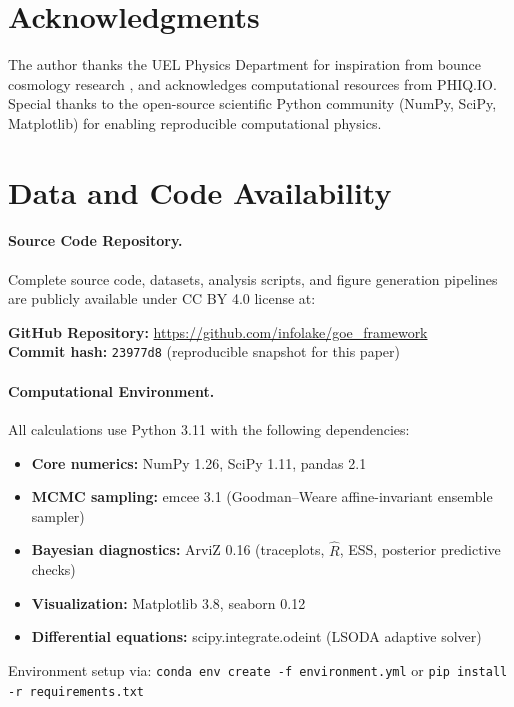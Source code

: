 \documentclass[12pt]{article}
\theoremstyle{definition}
\theoremstyle{plain}
\begin{document}
\section*{Acknowledgments}

The author thanks the UEL Physics Department for inspiration from bounce cosmology research \cite{barroso2024,demetrio2025}, and acknowledges computational resources from PHIQ.IO. Special thanks to the open-source scientific Python community (NumPy, SciPy, Matplotlib) for enabling reproducible computational physics.

\section*{Data and Code Availability}

\paragraph{Source Code Repository.}
Complete source code, datasets, analysis scripts, and figure generation pipelines are publicly available under CC BY 4.0 license at:

\begin{center}
\textbf{GitHub Repository:} \url{https://github.com/infolake/goe_framework} \\
\textbf{Commit hash:} \texttt{23977d8} (reproducible snapshot for this paper)
\end{center}

\paragraph{Computational Environment.}
All calculations use Python 3.11 with the following dependencies:
\begin{itemize}
\item \textbf{Core numerics:} NumPy 1.26, SciPy 1.11, pandas 2.1
\item \textbf{MCMC sampling:} emcee 3.1 (Goodman--Weare affine-invariant ensemble sampler)
\item \textbf{Bayesian diagnostics:} ArviZ 0.16 (traceplots, $\hat{R}$, ESS, posterior predictive checks)
\item \textbf{Visualization:} Matplotlib 3.8, seaborn 0.12
\item \textbf{Differential equations:} scipy.integrate.odeint (LSODA adaptive solver)
\end{itemize}

\noindent Environment setup via: \texttt{conda env create -f environment.yml} or \texttt{pip install -r requirements.txt}
\end{document}
